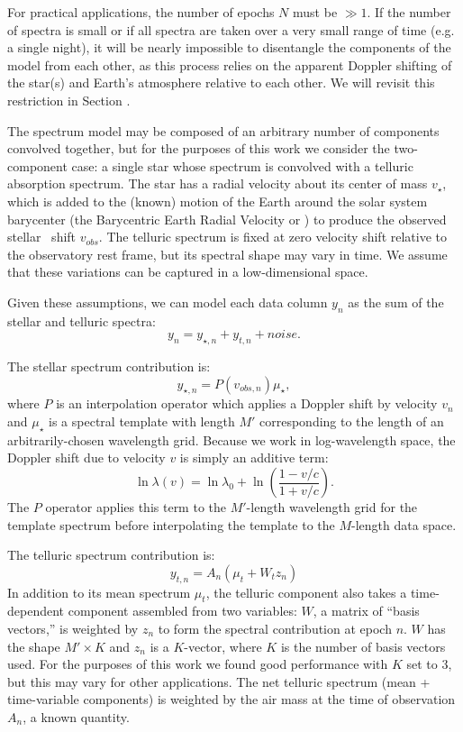 \documentclass[modern]{aastex62}
\begin{document}
For practical applications, the number of epochs $N$ must be $\gg 1$. 
If the number of spectra is small or if all spectra are taken over a very small range of time (e.g. a single night), it will be nearly impossible to disentangle the components of the model from each other, as this process relies on the apparent Doppler shifting of the star(s) and Earth's atmosphere relative to each other. 
We will revisit this restriction in Section \label{s:future}.

The spectrum model may be composed of an arbitrary number of components convolved together, but for the purposes of this work we consider the two-component case: a single star whose spectrum is convolved with a telluric absorption spectrum. 
The star has a radial velocity about its center of mass $v_{\star}$, which is added to the (known) motion of the Earth around the solar system barycenter (the Barycentric Earth Radial Velocity or \BERV ) to produce the observed stellar \RV\ shift $v_{obs}$. 
The telluric spectrum is fixed at zero velocity shift relative to the observatory rest frame, but its spectral shape may vary in time. 
We assume that these variations can be captured in a low-dimensional space.

Given these assumptions, we can model each data column $y_n$ as the sum of the stellar and telluric spectra:
\begin{equation}
y_n = y_{\star, n} + y_{t, n} + noise.
\end{equation}

The stellar spectrum contribution is: 
\begin{equation}
y_{\star, n} = P(v_{obs, n}) \mu_{\star},
\end{equation}
where $P$ is an interpolation operator which applies a Doppler shift by velocity $v_n$ and $\mu_{\star}$ is a spectral template with length $M'$ corresponding to the length of an arbitrarily-chosen wavelength grid. 
Because we work in log-wavelength space, the Doppler shift due to velocity $v$ is simply an additive term:
\begin{equation}
 \ln \lambda(v) = \ln \lambda_{0} + \ln \left(\frac{1 - v/c}{1 + v/c}\right).
\end{equation}
The $P$ operator applies this term to the $M'$-length wavelength grid for the template spectrum before interpolating the template to the $M$-length data space.

The telluric spectrum contribution is:
\begin{equation}
y_{t, n} =  A_n(\mu_{t} + W_{t} z_n)
\end{equation}
In addition to its mean spectrum $\mu_t$, the telluric component also takes a time-dependent component assembled from two variables: $W$, a matrix of ``basis vectors,'' is weighted by $z_n$ to form the spectral contribution at epoch $n$. 
$W$ has the shape $M' \times K$ and $z_n$ is a $K$-vector, where $K$ is the number of basis vectors used. 
For the purposes of this work we found good performance with $K$ set to 3, but this may vary for other applications. 
The net telluric spectrum (mean + time-variable components) is weighted by the air mass at the time of observation $A_n$, a known quantity.
\end{document}
